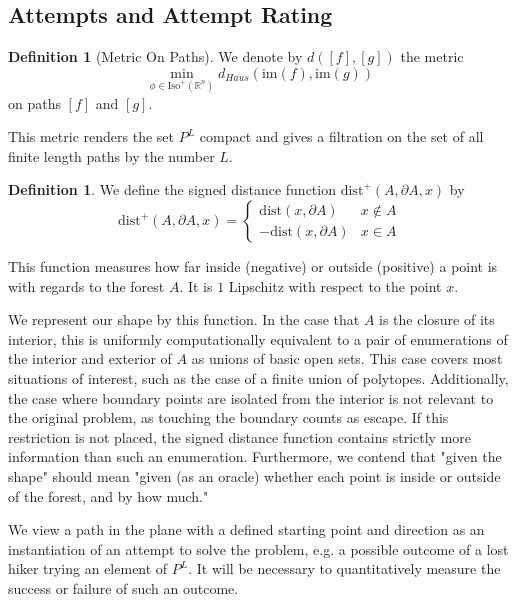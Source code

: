 \documentclass[10pt,a4paper]{article}
\theoremstyle{definition}
\newtheorem{dfn}[thm]{Definition}
\def\R{\mathbb{R}}
\begin{document}
\subsection{Attempts and Attempt Rating}
\label{sec:twopointone}
\begin{dfn}[Metric On Paths]
We denote by $d([f],[g])$ the metric $$\min_{\phi \in \mathrm{Iso}^+(\R^n)}d_{Haus}(\mathrm{im}(f),\mathrm{im}(g))$$ on paths $[f]$ and $[g]$. 
\end{dfn}
\label{dfn:pathmetric}
This metric renders the set $P^L$ compact and gives a filtration on the set of all finite length paths by the number $L$.

\begin{dfn}
We define the signed distance function $\mathrm{dist}^+(A,\partial A, x)$ by
$$\mathrm{dist}^+(A,\partial A, x) = \begin{cases}
    \mathrm{dist}(x,\partial A) & x\notin A\\
    -\mathrm{dist}(x,\partial A) & x\in A
\end{cases}$$
\end{dfn}
\label{dfn:distplus}

This function measures how far inside (negative) or outside (positive) a point is with regards to the forest $A$. It is $1$ Lipschitz with respect to the point $x$. 

We represent our shape by this function. In the case that $A$ is the closure of its interior, this is uniformly computationally equivalent to a pair of enumerations of the interior and exterior of $A$ as unions of basic open sets. This case covers most situations of interest, such as the case of a finite union of polytopes. Additionally, the case where boundary points are isolated from the interior is not relevant to the original problem, as touching the boundary counts as escape. If this restriction is not placed, the signed distance function contains strictly more information than such an enumeration. Furthermore, we contend that "given the shape" should mean "given (as an oracle) whether each point is inside or outside of the forest, and by how much."

We view a path in the plane with a defined starting point and direction as an instantiation of an attempt to solve the problem, e.g. a possible outcome of a lost hiker trying an element of $P^L$. It will be necessary to quantitatively measure the success or failure of such an outcome.
\end{document}
